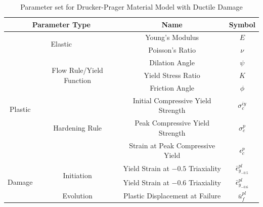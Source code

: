\begin{table}[!htb]
\centering
\caption{{Parameter set for Drucker-Prager Material Model with Ductile Damage}}
\label{tab:druckerParameters}
\begin{tabular}{@{}cccc@{}}
\toprule
\multicolumn{2}{c}{\textbf{Parameter Type}}                                                                      & \textbf{Name}                              & \textbf{Symbol}                   \\ \midrule
\multicolumn{2}{c}{\multirow{2}{*}{Elastic}}                                                                     & Young's Modulus                            & $E$                               \\
\multicolumn{2}{c}{}                                                                                             & Poisson's Ratio                            & $\nu$                             \\ \cmidrule{1-2}
\multirow{6}{*}{Plastic} & \multirow{3}{*}{Flow Rule/Yield Function} 											 & Dilation Angle                             & $\psi$                            \\
                         &                                                                                       & Yield Stress Ratio                         & $K$                               \\
                         &                                                                                       & Friction Angle                             & $\phi$                           \\ \cmidrule{2-2}
                         & \multirow{3}{*}{Hardening Rule}                                                       & Initial Compressive Yield Strength         & $\sigma_c^{iy}$                   \\
                         &                                                                                       & Peak Compressive Yield Strength & $\sigma_c^{p}$                    \\
                         &                                                                                       & Strain at Peak Compressive Yield           & $\epsilon_c^{p}$                 \\ \cmidrule{1-2}
\multirow{3}{*}{Damage}  & \multirow{2}{*}{Initiation}                                                           & Yield Strain at $-0.5$ Triaxiality         & $\bar{\epsilon}^{pl}_{y_{-0.5}}$  \\
                         &                                                                                       & Yield Strain at $-0.6$ Triaxiality        & $\bar{\epsilon}^{pl}_{y_{-0.6}}$ \\ \cmidrule{2-2}
                         & Evolution                                                                             & Plastic Displacement at Failure            & $\bar{u}^{pl}_f$                  \\ \bottomrule
\end{tabular}
\end{table}


